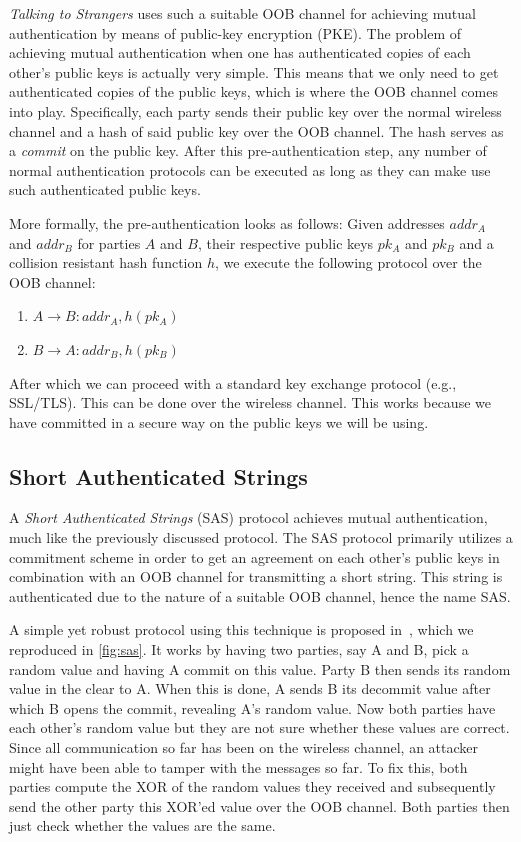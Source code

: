 \documentclass[conference, 11pt]{sty/IEEEtran}
\newlength{\arrow}
\begin{document}
\emph{Talking to Strangers} uses such a suitable OOB channel for achieving mutual authentication by means of public-key encryption (PKE).
The problem of achieving mutual authentication when one has authenticated copies of each other's public keys is actually very simple.
This means that we only need to get authenticated copies of the public keys, which is where the OOB channel comes into play.
Specifically, each party sends their public key over the normal wireless channel and a hash of said public key over the OOB channel.
The hash serves as a \emph{commit} on the public key.
After this pre-authentication step, any number of normal authentication protocols can be executed as long as they can make use such authenticated public keys.

More formally, the pre-authentication looks as follows:
Given addresses $addr_A$ and $addr_B$ for parties $A$ and $B$, their respective public keys $pk_A$ and $pk_B$ and a collision resistant hash function $h$, we execute the following protocol over the OOB channel:

\begin{enumerate}
    \item $A \rightarrow B: addr_A, h(pk_A)$
    \item $B \rightarrow A: addr_B, h(pk_B)$
\end{enumerate}

After which we can proceed with a standard key exchange protocol (e.g., SSL/TLS).
This can be done over the wireless channel.
This works because we have committed in a secure way on the public keys we will be using.

\subsection{Short Authenticated Strings}
\label{ssec:short_authenticated_strings}

A \emph{Short Authenticated Strings} (SAS) protocol achieves mutual authentication, much like the previously discussed protocol.
The SAS protocol primarily utilizes a commitment scheme in order to get an agreement on each other's public keys in combination with an OOB channel for transmitting a short string.
This string is authenticated due to the nature of a suitable OOB channel, hence the name SAS.

A simple yet robust protocol using this technique is proposed in~\cite{pasini2006sas}, which we reproduced in \autoref{fig:sas}.
It works by having two parties, say A and B, pick a random value and having A commit on this value.
Party B then sends its random value in the clear to A.
When this is done, A sends B its decommit value after which B opens the commit, revealing A's random value.
Now both parties have each other's random value but they are not sure whether these values are correct.
Since all communication so far has been on the wireless channel, an attacker might have been able to tamper with the messages so far.
To fix this, both parties compute the XOR of the random values they received and subsequently send the other party this XOR'ed value over the OOB channel.
Both parties then just check whether the values are the same.
\end{document}
